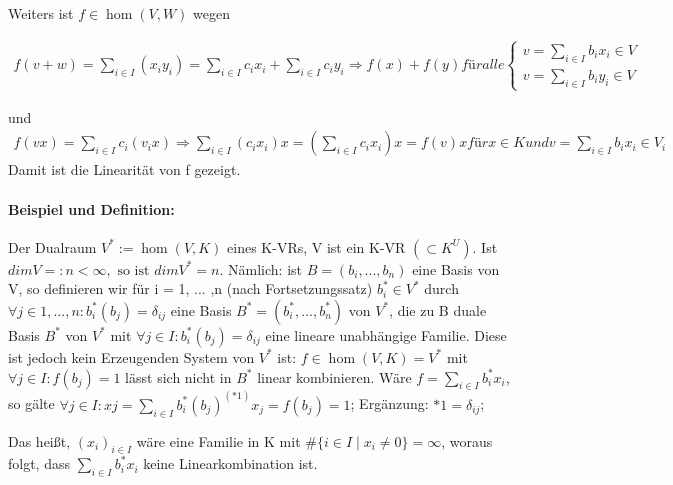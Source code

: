     Weiters ist $f\in\hom(V,W)$ wegen
    
     \begin{gather*}
     f(v+w) =\sum_{i\in I}(x_iy_i)=\sum_{i\in I}c_ix_i+ \sum_{i\in I}c_iy_i\Rightarrow f(x) + f(y) für alle\left\{
     \begin{array}{l}
     v=\sum_{i\in I}b_ix_i \in V\\
     v=\sum_{i\in I}b_iy_i \in V
     \end{array}
     \right.
     \end{gather*}
    
    und
    \begin{gather*}
    f(vx) =\sum_{i\in I}c_i(v_ix)\Rightarrow\sum_{i\in I}(c_ix_i)x = (\sum_{i\in I}c_ix_i)x= f(v)x für x\in K und v= \sum_{i\in I}b_ix_i \in V_i
    \end{gather*}
    Damit ist die Linearität von f gezeigt.
    
    \paragraph{Beispiel und Definition:} Der Dualraum $V^\ast := \hom(V,K)$ eines K-VRs, V ist ein K-VR $(\subset K^U)$. Ist $dimV=:n<\infty, \text{ so ist } dimV^\ast=n$. Nämlich: ist $B=(b_i, ... ,b_n)$ eine Basis von V, so definieren wir für i = 1, ... ,n (nach Fortsetzungssatz) $b_i^\ast\in V^\ast$ durch $\forall j\in{1,...,n}:b_i^\ast(b_j)=\delta_{ij}$ eine Basis $B^\ast=(b_i^\ast,...,b_n^\ast)$ von $V^\ast$, die zu B duale Basis $B^\ast$ von $V^\ast$ mit $\forall j\in I:b_i^\ast(b_j)=\delta_{ij}$ eine lineare unabhängige Familie. Diese ist jedoch kein Erzeugenden System von $V^\ast$ ist: $f\in\hom(V,K)=V^\ast$ mit $\forall j\in I:f(b_j)=1$ lässt sich nicht in $B^\ast$ linear kombinieren. Wäre $f=\sum_{i\in I}b_i^\ast x_i$, so gälte $\forall j\in I: xj =\sum_{i\in I}b_i^\ast(b_j)^{(*1)}x_j= f(b_j) = 1$; Ergänzung: $*1= \delta_{ij}$; 
    
    Das heißt, $(x_i)_{i\in I}$ wäre eine Familie in K mit $\#\{i\in I\mid x_i\neq0\}=\infty$, woraus folgt, dass $\sum_{i\in I}b_i^\ast x_i$ keine Linearkombination ist.
